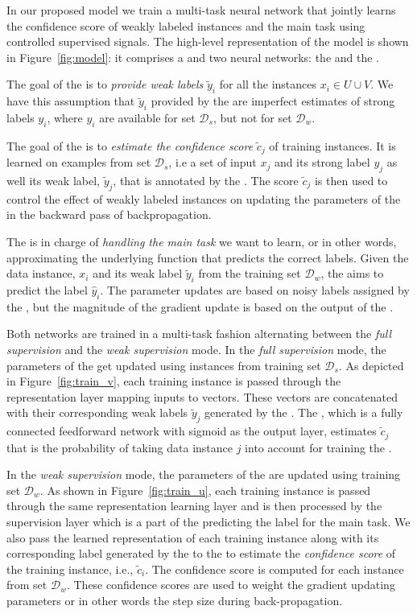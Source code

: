 In our proposed model we train a multi-task neural network that jointly learns the confidence score of weakly labeled instances and the main task using controlled supervised signals.
%
The high-level representation of the model is shown in Figure~\ref{fig:model}: it comprises a \wa and two neural networks: the \cnet and the \tnet. 

The goal of the \wa is to \emph{provide weak labels} $\tilde{y}_i$ for all the instances $x_i \in U \cup V$. We have this assumption that $\tilde{y}_i$ provided by the \wa are imperfect estimates of strong labels $y_i$, where $y_i$ are available for set $\mathcal{D}_s$, but not for set $\mathcal{D}_w$.

The goal of the \cnet is to \emph{estimate the confidence score} $\tilde{c}_j$ of training instances. It is learned on examples from set $\mathcal{D}_s$, i.e a set of input $x_j$ and its strong label $y_j$ as well its weak label,  $\tilde{y}_j$,  that is annotated by the \wa.
The score $\tilde{c}_j$ is then used to control the effect of weakly labeled instances on updating the parameters of the \tnet in the backward pass of backpropagation.

The \tnet is in charge of \emph{handling the main task} we want to learn, or in other words, approximating the underlying function that predicts the correct labels. 
Given the data instance, $x_i$ and its weak label $\tilde{y}_i$ from the training set $\mathcal{D}_w$, the \tnet aims to predict the label $\hat{y}_i$. 
The \tnet parameter updates are based on noisy labels assigned by the \wa, but the magnitude of the gradient update is based on the output of the \cnet. 

Both networks are trained in a multi-task fashion alternating between the \emph{full supervision} and the \emph{weak supervision} mode.  
In the \emph{full supervision} mode, the parameters of the \cnet get updated using instances from training set $\mathcal{D}_s$.  
As depicted in Figure~\ref{fig:train_v}, each training instance is passed through the representation layer mapping inputs to vectors. These vectors are concatenated with their corresponding weak labels $\tilde{y}_j$ generated by the \wa.
The \cnet, which is a fully connected feedforward network with sigmoid as the output layer, estimates $\tilde{c}_j$ that is the probability of taking data instance $j$ into account for training the \tnet.

In the \emph{weak supervision} mode, the parameters of the \tnet are updated using training set $\mathcal{D}_w$.
As shown in Figure~\ref{fig:train_u}, each training instance is passed through the same representation learning layer and is then processed by the supervision layer which is a part of the \tnet predicting the label for the main task. 
%
We also pass the learned representation of each training instance along with its corresponding label generated by the \wa to the \cnet to estimate the \emph{confidence score} of the training instance, i.e., $\tilde{c}_i$. 
The confidence score is computed for each instance from set $\mathcal{D}_w$. These confidence scores are used to weight the gradient updating \tnet parameters or in other words the step size during back-propagation. 

